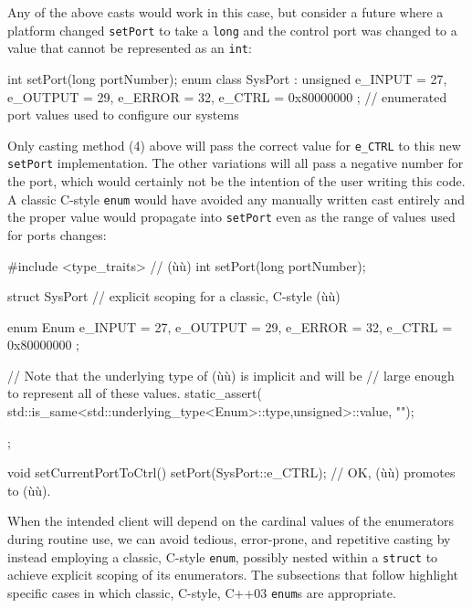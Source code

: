 \noindent Any of the above casts would work in this case, but consider a future
where a platform changed \lstinline!setPort! to take a \lstinline!long! and
the control port was changed to a value that cannot be represented as an
\lstinline!int!:

\begin{emcppslisting}
int setPort(long portNumber);
enum class SysPort : unsigned { e_INPUT = 27, e_OUTPUT = 29, e_ERROR = 32,
                                e_CTRL = 0x80000000 };
    // enumerated port values used to configure our systems
\end{emcppslisting}

\noindent Only casting method (4) above will pass the correct value for
\lstinline!e_CTRL! to this new \lstinline!setPort! implementation. The other
variations will all pass a negative number for the port, which would
certainly not be the intention of the user writing this code. A classic
C-style \lstinline!enum! would have avoided any manually written cast
entirely and the proper value would propagate into \lstinline!setPort! even
as the range of values used for ports changes:

\begin{emcppshiddenlisting}[emcppsbatch=e12]
#include <type_traits>  // (ù{}ù)
int setPort(long portNumber);
\end{emcppshiddenlisting}
\begin{emcppslisting}[emcppsbatch=e12]
struct SysPort  // explicit scoping for a classic, C-style (ù{}ù)
{
    enum Enum { e_INPUT = 27, e_OUTPUT = 29, e_ERROR = 32,
                e_CTRL = 0x80000000 };

    // Note that the underlying type of (ù{}ù) is implicit and will be
    // large enough to represent all of these values.
    static_assert(
        std::is_same<std::underlying_type<Enum>::type,unsigned>::value, "");
};

void setCurrentPortToCtrl()
{
    setPort(SysPort::e_CTRL);  // OK, (ù{}ù) promotes to (ù{}ù).
}
\end{emcppslisting}

\noindent When the intended client will depend on the cardinal values of the
enumerators during routine use, we can avoid tedious, error-prone, and
repetitive casting by instead employing a classic, C-style
\lstinline!enum!, possibly nested within a \lstinline!struct! to achieve
explicit scoping of its enumerators. The subsections that follow
highlight specific cases in which classic, C-style, C++03
\lstinline!enum!s are appropriate.

